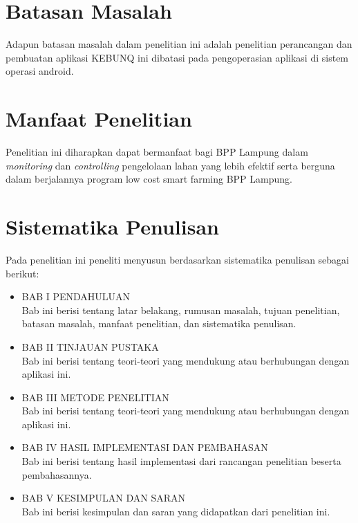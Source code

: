 \begin{flushleft}
\begin{justify}
    \section{Batasan Masalah}
      Adapun batasan masalah dalam penelitian ini adalah penelitian perancangan dan pembuatan aplikasi KEBUNQ ini dibatasi pada pengoperasian aplikasi di sistem operasi android.
      \\
    \section{Manfaat Penelitian}
    Penelitian ini diharapkan dapat bermanfaat bagi BPP Lampung dalam \textit{monitoring} dan \textit{controlling} pengelolaan lahan yang lebih efektif serta berguna dalam berjalannya program low cost smart farming BPP Lampung.
    \\


    \section{Sistematika Penulisan}
    Pada penelitian ini peneliti menyusun berdasarkan sistematika penulisan sebagai berikut: 
      \begin{itemize}
        \item BAB I PENDAHULUAN
        \\
        Bab ini berisi tentang latar belakang, rumusan masalah, tujuan penelitian, 
        batasan masalah, manfaat penelitian, dan sistematika penulisan.

        \item BAB II TINJAUAN PUSTAKA
        \\
          Bab ini berisi tentang teori-teori yang mendukung atau berhubungan dengan aplikasi ini.
        \item BAB III METODE PENELITIAN
        \\
          Bab ini berisi tentang teori-teori yang mendukung atau berhubungan dengan aplikasi ini.
        \item BAB IV HASIL IMPLEMENTASI DAN PEMBAHASAN
        \\
          Bab ini berisi tentang hasil implementasi dari rancangan penelitian beserta pembahasannya.
        \item BAB V KESIMPULAN DAN SARAN
        \\
          Bab ini berisi kesimpulan dan saran yang didapatkan dari penelitian ini.
        \\
      \end{itemize}

  \end{justify}

\end{flushleft}
\newpage